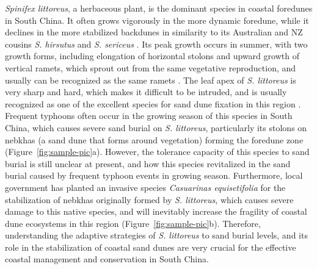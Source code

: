 \documentclass[]{interact}
\theoremstyle{plain}%
\theoremstyle{definition}
\theoremstyle{remark}
\begin{document}
\label{Introduction-4}
\textit{Spinifex littoreus}, a herbaceous plant, is the dominant species in coastal foredunes in South China. It often grows vigorously in the more dynamic foredune, while it declines in the more stabilized backdunes in similarity to its Australian and NZ cousins \textit{S. hirsutus} and \textit{S. sericeus} \citep{hespReviewBiologicalGeomorphological1989}. Its peak growth occurs in summer, with two growth forms, including elongation of horizontal stolons and upward growth of vertical ramets, which sprout out from the same vegetative reproduction, and usually can be recognized as the same ramets \citep{jacksonPopulationBiologyEvolution1985}. The leaf apex of \textit{S. littoreus} is very sharp and hard, which makes it difficult to be intruded, and is usually recognized as one of the excellent species for sand dune fixation in this region \citep{yangDiurnalvariationcharacteristics2017}. Frequent typhoons often occur in the growing season of this species in South China, which causes severe sand burial on \textit{S. littoreus}, particularly its stolons on nebkhas (a sand dune that forms around vegetation) forming the foredune zone \citep{yangDiurnalvariationcharacteristics2017}(Figure~\ref{fig:sample-pic}a). However, the tolerance capacity of this species to sand burial is still unclear at present, and how this species revitalized in the sand burial caused by frequent typhoon events in growing season. Furthermore, local government has planted an invasive species \textit{Casuarinas equisetifolia} for the stabilization of nebkhas originally formed by \textit{S. littoreus}, which causes severe damage to this native species, and will inevitably increase the fragility of coastal dune ecosystems in this region (Figure~\ref{fig:sample-pic}b). Therefore, understanding the adaptive strategies of \textit{S. littoreus} to sand burial levels, and its role in the stabilization of coastal sand dunes are very crucial for the effective coastal management and conservation in South China. 
\end{document}
